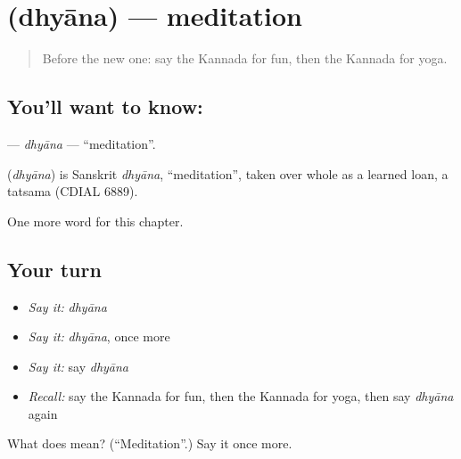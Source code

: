 \section[\texorpdfstring{\kn{ಧ್ಯಾನ} (dhyāna)}{ಧ್ಯಾನ (dhyāna)}]{ (dhyāna) — meditation}

\label{lesson:KA-C209-dhyana}



\begin{quote}
Before the new one: say the Kannada for fun, then the Kannada for yoga.
\end{quote}

\subsection*{You'll want to know: }
\textbf{} — \emph{dhyāna} — \textquotedblleft{}meditation\textquotedblright{}.

\begin{cousinweb}
\textbf{} (\emph{dhyāna}) is Sanskrit \emph{dhyāna}, \textquotedblleft{}meditation\textquotedblright{}, taken over whole as a learned loan, a tatsama (CDIAL 6889).
\end{cousinweb}

\begin{grammarlens}[title={What you've built}]
One more word for this chapter.
\end{grammarlens}

\subsection*{Your turn}
\begin{itemize}
\raggedright
  \item \emph{Say it:} \emph{dhyāna}
  \item \emph{Say it:} \emph{dhyāna}, once more
  \item \emph{Say it:} say \emph{dhyāna}
  \item \emph{Recall:} say the Kannada for fun, then the Kannada for yoga, then say \emph{dhyāna} again
\end{itemize}

\begin{tcolorbox}[breakable,colback=teal!4,colframe=teal!35!black,title={Before you move on}]
What does  mean? (\textquotedblleft{}Meditation\textquotedblright{}.) Say it once more.
\end{tcolorbox}
